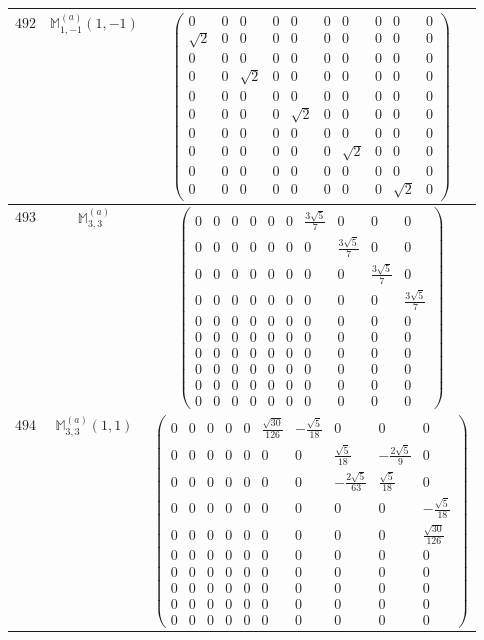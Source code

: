 \documentclass[fleqn,8pt,landscape]{jsarticle}
\begin{document}
\begin{center}
\begin{longtable}{ccc}
$ 492 $ & $ \mathbb{M}_{1,-1}^{(a)}(1,-1) $ & $ \begin{pmatrix} 0 & 0 & 0 & 0 & 0 & 0 & 0 & 0 & 0 & 0 \\ \sqrt{2} & 0 & 0 & 0 & 0 & 0 & 0 & 0 & 0 & 0 \\ 0 & 0 & 0 & 0 & 0 & 0 & 0 & 0 & 0 & 0 \\ 0 & 0 & \sqrt{2} & 0 & 0 & 0 & 0 & 0 & 0 & 0 \\ 0 & 0 & 0 & 0 & 0 & 0 & 0 & 0 & 0 & 0 \\ 0 & 0 & 0 & 0 & \sqrt{2} & 0 & 0 & 0 & 0 & 0 \\ 0 & 0 & 0 & 0 & 0 & 0 & 0 & 0 & 0 & 0 \\ 0 & 0 & 0 & 0 & 0 & 0 & \sqrt{2} & 0 & 0 & 0 \\ 0 & 0 & 0 & 0 & 0 & 0 & 0 & 0 & 0 & 0 \\ 0 & 0 & 0 & 0 & 0 & 0 & 0 & 0 & \sqrt{2} & 0 \end{pmatrix} $ \\ \hline
$ 493 $ & $ \mathbb{M}_{3,3}^{(a)} $ & $ \begin{pmatrix} 0 & 0 & 0 & 0 & 0 & 0 & \frac{3 \sqrt{5}}{7} & 0 & 0 & 0 \\ 0 & 0 & 0 & 0 & 0 & 0 & 0 & \frac{3 \sqrt{5}}{7} & 0 & 0 \\ 0 & 0 & 0 & 0 & 0 & 0 & 0 & 0 & \frac{3 \sqrt{5}}{7} & 0 \\ 0 & 0 & 0 & 0 & 0 & 0 & 0 & 0 & 0 & \frac{3 \sqrt{5}}{7} \\ 0 & 0 & 0 & 0 & 0 & 0 & 0 & 0 & 0 & 0 \\ 0 & 0 & 0 & 0 & 0 & 0 & 0 & 0 & 0 & 0 \\ 0 & 0 & 0 & 0 & 0 & 0 & 0 & 0 & 0 & 0 \\ 0 & 0 & 0 & 0 & 0 & 0 & 0 & 0 & 0 & 0 \\ 0 & 0 & 0 & 0 & 0 & 0 & 0 & 0 & 0 & 0 \\ 0 & 0 & 0 & 0 & 0 & 0 & 0 & 0 & 0 & 0 \end{pmatrix} $ \\ \hline
$ 494 $ & $ \mathbb{M}_{3,3}^{(a)}(1,1) $ & $ \begin{pmatrix} 0 & 0 & 0 & 0 & 0 & \frac{\sqrt{30}}{126} & - \frac{\sqrt{5}}{18} & 0 & 0 & 0 \\ 0 & 0 & 0 & 0 & 0 & 0 & 0 & \frac{\sqrt{5}}{18} & - \frac{2 \sqrt{5}}{9} & 0 \\ 0 & 0 & 0 & 0 & 0 & 0 & 0 & - \frac{2 \sqrt{5}}{63} & \frac{\sqrt{5}}{18} & 0 \\ 0 & 0 & 0 & 0 & 0 & 0 & 0 & 0 & 0 & - \frac{\sqrt{5}}{18} \\ 0 & 0 & 0 & 0 & 0 & 0 & 0 & 0 & 0 & \frac{\sqrt{30}}{126} \\ 0 & 0 & 0 & 0 & 0 & 0 & 0 & 0 & 0 & 0 \\ 0 & 0 & 0 & 0 & 0 & 0 & 0 & 0 & 0 & 0 \\ 0 & 0 & 0 & 0 & 0 & 0 & 0 & 0 & 0 & 0 \\ 0 & 0 & 0 & 0 & 0 & 0 & 0 & 0 & 0 & 0 \\ 0 & 0 & 0 & 0 & 0 & 0 & 0 & 0 & 0 & 0 \end{pmatrix} $ \\ \hline

\end{longtable}
\end{center}
\end{document}
